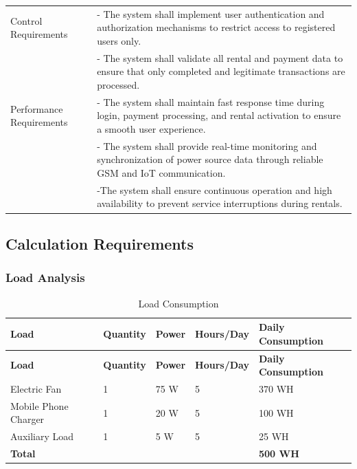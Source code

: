 {\begin{longtable}{p{4cm} p{9cm}}
	Control Requirements & - The system shall implement user authentication and authorization mechanisms to restrict access to registered users only. \\
	& - The system shall validate all rental and payment data to ensure that only completed and legitimate transactions are processed. \\
	\midrule
	
	Performance Requirements & - The system shall maintain fast response time during login, payment processing, and rental activation to ensure a smooth user experience. \\
	& - The system shall provide real-time monitoring and synchronization of power source data through reliable GSM and IoT communication.\\
	& -The system shall ensure continuous operation and high availability to prevent service interruptions during rentals. \\
\end{longtable} 

\subsection{Calculation Requirements}

\subsubsection{Load Analysis}

\begin{longtable}{p{3cm} p{2cm} p{2cm} p{2cm} p{4cm}}
	\caption{Load Consumption} \label{tab:LoadConsumption} \\
	\toprule
	\textbf{Load} & \textbf{Quantity} & \textbf{Power} & \textbf{Hours/Day} & \textbf{Daily Consumption} \\
	\midrule
	\endfirsthead
	
	\toprule
	\textbf{Load} & \textbf{Quantity} & \textbf{Power} & \textbf{Hours/Day} & \textbf{Daily Consumption} \\
	\midrule
	\endhead
	
	\bottomrule
	\endfoot
	
	Electric Fan & 1 & 75 W & 5 & 370 WH \\
	Mobile Phone Charger & 1 & 20 W & 5 & 100 WH \\
	Auxiliary Load & 1 & 5 W & 5 & 25 WH \\
	\midrule
	\textbf{Total} & & & & \textbf{500 WH} \\
\end{longtable}

}
